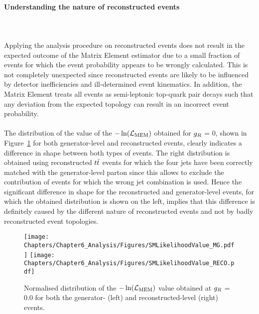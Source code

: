 \paragraph{Understanding the nature of reconstructed events} \hfill \\ %
\\
Applying the analysis procedure on reconstructed events does not result in the expected outcome of the Matrix Element estimator due to a small fraction of events for which the event probability appears to be wrongly calculated.
This is not completely unexpected since reconstructed events are likely to be influenced by detector inefficiencies and ill-determined event kinematics.
In addition, the Matrix Element treats all events as semi-leptonic top-quark pair decays such that any deviation from the expected topology can result in an incorrect event probability.
\\
\\
The distribution of the value of the $-\ln(\mathcal{L}_{\textrm{MEM}})$ obtained for $g_{R}$ = $0$, shown in Figure~\ref{fig::SMLik} for both generator-level and reconstructed events, clearly indicates a difference in shape between both types of events.
The right distribution is obtained using reconstructed $t\bar{t}$ events for which the four jets have been correctly matched with the generator-level parton since this allows to exclude the contribution of events for which the wrong jet combination is used. Hence the significant difference in shape for the reconstructed and generator-level events, for which the obtained distribution is shown on the left, implies that this difference is definitely caused by the different nature of reconstructed events and not by badly reconstructed event topologies.
\begin{figure}[h!t]
 \centering
 \texttt{[image: Chapters/Chapter6\_Analysis/Figures/SMLikelihoodValue\_MG.pdf]} \hspace{0.2cm}
 \texttt{[image: Chapters/Chapter6\_Analysis/Figures/SMLikelihoodValue\_RECO.pdf]}
 \caption{Normalised distribution of the $-\ln(\mathcal{L}_{\textrm{MEM}})$ value obtained at $g_{R}$ = $0.0$ for both the generator- (left) and reconstructed-level (right) events.} \label{fig::SMLik}
\end{figure}

